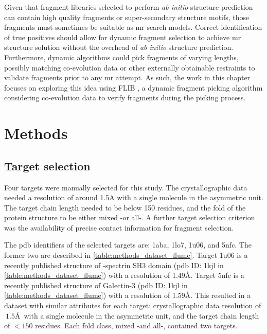 Given that fragment libraries selected to perform \textit{ab initio} structure prediction can contain high quality fragments or super-secondary structure motifs, those fragments must sometimes be suitable as \gls{mr} search models. Correct identification of true positives should allow for dynamic fragment selection to achieve \gls{mr} structure solution without the overhead of \textit{ab initio} structure prediction. Furthermore, dynamic algorithms could pick fragments of varying lengths, possibly matching co-evolution data or other externally obtainable restraints to validate fragments prior to any \gls{mr} attempt. As such, the work in this chapter focuses on exploring this idea using FLIB \cite{De_Oliveira2015-ba}, a dynamic fragment picking algorithm considering co-evolution data to verify fragments during the picking process.

\section{Methods}
\subsection{Target selection}
Four targets were manually selected for this study. The crystallographic data needed a resolution of around 1.5A with a single molecule in the asymmetric unit. The target chain length needed to be below 150 residues, and the fold of the protein structure to be either mixed \textalpha-\textbeta or all-\textbeta. A further target selection criterion was the availability of precise contact information for fragment selection.

The \gls{pdb} identifiers of the selected targets are: 1aba, 1lo7, 1u06, and 5nfc. The former two are described in \cref{table:methods_dataset_flume}. Target 1u06 is a recently published structure of \textalpha-spectrin SH3 domain (\gls{pdb} ID: 1kjl in \cref{table:methods_dataset_flume}) with a resolution of 1.49\AA. Target 5nfc is a recently published structure of Galectin-3 (\gls{pdb} ID: 1kjl in \cref{table:methods_dataset_flume}) with a resolution of 1.59\AA. This resulted in a dataset with similar attributes for each target: crystallographic data resolution of $~1.5$\AA\ with a single molecule in the asymmetric unit, and the target chain length of $<150$ residues. Each fold class, mixed \textalpha-\textbeta and all-\textbeta, contained two targets.

